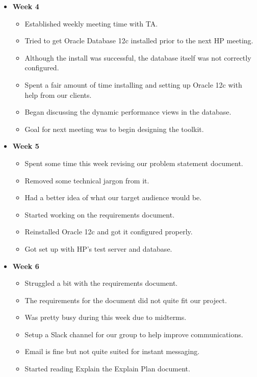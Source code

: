 \documentclass[xcolor=dvipsnames]{beamer}
\begin{document}
\begin{frame}
\begin{itemize}
    \item \textbf{Week 4}
    \begin{itemize}
  	    \item Established weekly meeting time with TA.
  	    \item Tried to get Oracle Database 12c installed prior to the next HP meeting.
  	    \item Although the install was successful, the database itself was not correctly configured.
  	    \item Spent a fair amount of time installing and setting up Oracle 12c with help from our clients.
  	    \item Began discussing the dynamic performance views in the database.
  	    \item Goal for next meeting was to begin designing the toolkit.
    \end{itemize}
\end{itemize}
\end{frame}

\begin{frame}
\begin{itemize}
    \item \textbf{Week 5}
    \begin{itemize}
  	    \item Spent some time this week revising our problem statement document.
  	    \item Removed some technical jargon from it.
  	    \item Had a better idea of what our target audience would be.
  	    \item Started working on the requirements document.
  	    \item Reinstalled Oracle 12c and got it configured properly.
  	    \item Got set up with HP's test server and database.
    \end{itemize}
\end{itemize}
\end{frame}

\begin{frame}
\begin{itemize}
	\item \textbf{Week 6}
    \begin{itemize}
    	\item Struggled a bit with the requirements document.
    	\item The requirements for the document did not quite fit our project.
    	\item Was pretty busy during this week due to midterms.
    	\item Setup a Slack channel for our group to help improve communications.
   		\item Email is fine but not quite suited for instant messaging.
   		\item Started reading Explain the Explain Plan document.
	\end{itemize}
\end{itemize}
\end{frame}
\end{document}
